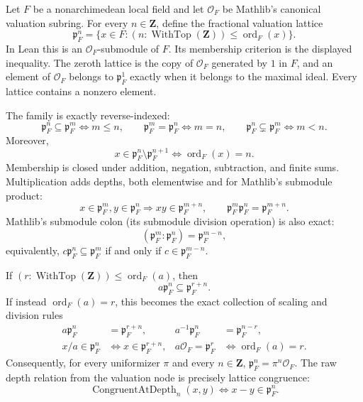 \begin{definition}\label{mod:localfield-lattices}
Let $F$ be a nonarchimedean local field and let
$\mathcal O_F$ be Mathlib's canonical valuation subring.  For every
$n\in\mathbf Z$, define the fractional valuation lattice
\[
  \mathfrak p_F^n
  =\{x\in F:(n:\operatorname{WithTop}(\mathbf Z))
                  \leq\operatorname{ord}_F(x)\}.
\]
In Lean this is an $\mathcal O_F$-submodule of $F$.  Its membership
criterion is the displayed inequality.  The zeroth lattice is the copy of
$\mathcal O_F$ generated by $1$ in $F$, and an element of $\mathcal O_F$
belongs to $\mathfrak p_F^1$ exactly when it belongs to the maximal ideal.
Every lattice contains a nonzero element.

The family is exactly reverse-indexed:
\[
  \mathfrak p_F^n\subseteq\mathfrak p_F^m\iff m\leq n,
  \qquad
  \mathfrak p_F^m=\mathfrak p_F^n\iff m=n,
  \qquad
  \mathfrak p_F^n\subsetneq\mathfrak p_F^m\iff m<n.
\]
Moreover,
\[
 x\in\mathfrak p_F^n\setminus\mathfrak p_F^{n+1}
 \iff \operatorname{ord}_F(x)=n.
\]
Membership is closed under addition, negation, subtraction, and finite
sums.  Multiplication adds depths, both elementwise and for Mathlib's
submodule product:
\[
 x\in\mathfrak p_F^m, y\in\mathfrak p_F^n
 \Longrightarrow xy\in\mathfrak p_F^{m+n},
 \qquad
 \mathfrak p_F^m\mathfrak p_F^n=\mathfrak p_F^{m+n}.
\]
Mathlib's submodule colon (its submodule division operation) is also exact:
\[
  (\mathfrak p_F^m:\mathfrak p_F^n)=\mathfrak p_F^{m-n},
\]
equivalently, $c\mathfrak p_F^n\subseteq\mathfrak p_F^m$ if and only if
$c\in\mathfrak p_F^{m-n}$.

If $(r:\operatorname{WithTop}(\mathbf Z))\leq\operatorname{ord}_F(a)$,
then
\[
  a\mathfrak p_F^n\subseteq\mathfrak p_F^{r+n}.
\]
If instead $\operatorname{ord}_F(a)=r$, this becomes the exact collection
of scaling and division rules
\[
 \begin{aligned}
  a\mathfrak p_F^n&=\mathfrak p_F^{r+n},&
  a^{-1}\mathfrak p_F^n&=\mathfrak p_F^{n-r},\\
  x/a\in\mathfrak p_F^n&\iff x\in\mathfrak p_F^{r+n},&
  a\mathcal O_F=\mathfrak p_F^r
    &\iff\operatorname{ord}_F(a)=r.
 \end{aligned}
\]
Consequently, for every uniformizer $\pi$ and every $n\in\mathbf Z$,
$\mathfrak p_F^n=\pi^n\mathcal O_F$.  The raw depth relation from the
valuation node is precisely lattice congruence:
\[
  \operatorname{CongruentAtDepth}_n(x,y)
  \iff x-y\in\mathfrak p_F^n.
\]


\end{definition}
